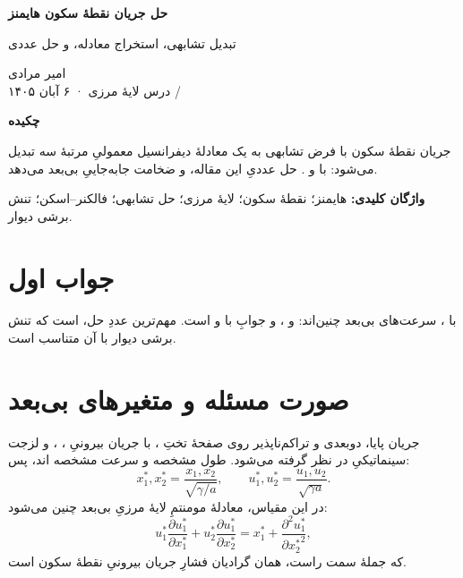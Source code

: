 \documentclass[12pt,a4paper]{article}
\begin{document}
\begin{center}
{\Large\bfseries حل جریان نقطهٔ سکون هایمنز\par}
\vspace{1ex}
{\large تبدیل تشابهی، استخراج معادله، و حل عددی\par}
\vspace{1ex}
{\small امیر مرادی\\
درس لایهٔ مرزی · ۶ آبان ۱۴۰۵ / \par}
\end{center}

\begin{center}{\large\bfseries چکیده}\end{center}
جریان نقطهٔ سکون با فرض تشابهی به یک معادلهٔ دیفرانسیل معمولیِ مرتبهٔ سه
تبدیل می‌شود:  با
 و . حل عددیِ این مقاله،
 و ضخامت جابه‌جاییِ بی‌بعد
 می‌دهد.

\noindent\textbf{واژگان کلیدی:} هایمنز؛ نقطهٔ سکون؛ لایهٔ مرزی؛ حل تشابهی؛
فالکنر--اسکن؛ تنش برشی دیوار.

\section{جواب اول}
با ، سرعت‌های بی‌بعد چنین‌اند:
 و ، و  جوابِ
 با  و
 است. مهم‌ترین عددِ حل، 
است که تنش برشی دیوار با آن متناسب است.

\section{صورت مسئله و متغیرهای بی‌بعد}
جریان پایا، دوبعدی و تراکم‌ناپذیر روی صفحهٔ تختِ ، با جریان
بیرونیِ ، ، و لزجت سینماتیکیِ \lr{$\gamma$}
در نظر گرفته می‌شود. طول مشخصه
 و سرعت مشخصه ‌اند، پس:
\begin{equation}
x_1^*, x_2^* = \frac{x_1, x_2}{\sqrt{\gamma/a}},
\qquad
u_1^*, u_2^* = \frac{u_1, u_2}{\sqrt{\gamma a}}.
\end{equation}
در این مقیاس، معادلهٔ مومنتمِ لایهٔ مرزیِ بی‌بعد چنین می‌شود:
\begin{equation}
u_1^*\frac{\partial u_1^*}{\partial x_1^*}
+ u_2^*\frac{\partial u_1^*}{\partial x_2^*}
= x_1^* + \frac{\partial^2 u_1^*}{\partial {x_2^*}^2},
\label{eq:bl}
\end{equation}
که جملهٔ  سمت راست، همان گرادیان فشارِ جریان بیرونیِ نقطهٔ
سکون است.
\end{document}
